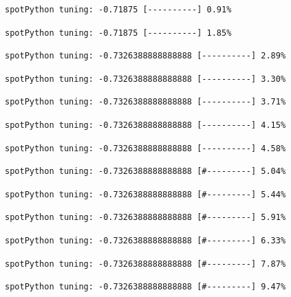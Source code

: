 \documentclass[
  letterpaper,
  DIV=11,
  numbers=noendperiod]{scrreprt}
\begin{document}
\begin{verbatim}
spotPython tuning: -0.71875 [----------] 0.91% 
\end{verbatim}

\begin{verbatim}
spotPython tuning: -0.71875 [----------] 1.85% 
\end{verbatim}

\begin{verbatim}
spotPython tuning: -0.7326388888888888 [----------] 2.89% 
\end{verbatim}

\begin{verbatim}
spotPython tuning: -0.7326388888888888 [----------] 3.30% 
\end{verbatim}

\begin{verbatim}
spotPython tuning: -0.7326388888888888 [----------] 3.71% 
\end{verbatim}

\begin{verbatim}
spotPython tuning: -0.7326388888888888 [----------] 4.15% 
\end{verbatim}

\begin{verbatim}
spotPython tuning: -0.7326388888888888 [----------] 4.58% 
\end{verbatim}

\begin{verbatim}
spotPython tuning: -0.7326388888888888 [#---------] 5.04% 
\end{verbatim}

\begin{verbatim}
spotPython tuning: -0.7326388888888888 [#---------] 5.44% 
\end{verbatim}

\begin{verbatim}
spotPython tuning: -0.7326388888888888 [#---------] 5.91% 
\end{verbatim}

\begin{verbatim}
spotPython tuning: -0.7326388888888888 [#---------] 6.33% 
\end{verbatim}

\begin{verbatim}
spotPython tuning: -0.7326388888888888 [#---------] 7.87% 
\end{verbatim}

\begin{verbatim}
spotPython tuning: -0.7326388888888888 [#---------] 9.47% 
\end{verbatim}
\end{document}
